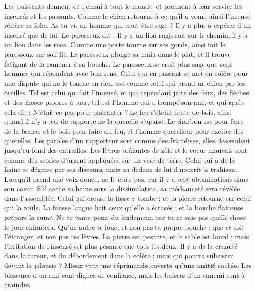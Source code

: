 \begin{multicols}{2}
Les puissants donnent de l'ennui à tout le monde, et prennent à leur service les insensés et les passants.
Comme le chien retourne à ce qu'il a vomi, ainsi l'insensé réitère sa folie.
As-tu vu un homme qui croit être sage ? Il y a plus à espérer d'un insensé que de lui.
Le paresseux dit : Il y a un lion rugissant sur le chemin, il y a un lion dans les rues.
Comme une porte tourne sur ses gonds, ainsi fait le paresseux sur son lit.
Le paresseux plonge sa main dans le plat, et il trouve fatigant de la ramener à sa bouche.
Le paresseux se croit plus sage que sept hommes qui répondent avec bon sens.
Celui qui en passant se met en colère pour une dispute qui ne le touche en rien, est comme celui qui prend un chien par les oreilles.
Tel est celui qui fait l'insensé, et qui cependant jette des feux, des flèches, et des choses propres à tuer,
tel est l'homme qui a trompé son ami, et qui après cela dit : N'était-ce pas pour plaisanter ?
Le feu s'éteint faute de bois, ainsi quand il n'y a pas de rapporteurs la querelle s'apaise.
Le charbon est pour faire de la braise, et le bois pour faire du feu, et l'homme querelleur pour exciter des querelles.
Les paroles d'un rapporteur sont comme des friandises, elles descendent jusqu'au fond des entrailles.
Les lèvres brûlantes de zèle et le coeur mauvais sont comme des scories d'argent appliquées sur un vase de terre.
Celui qui a de la haine se déguise par ses discours, mais au-dedans de lui il nourrit la trahison.
Lorsqu'il prend une voix douce, ne le crois pas, car il y a sept abominations dans son coeur.
S'il cache sa haine sous la dissimulation, sa méchanceté sera révélée dans l'assemblée.
Celui qui creuse la fosse y tombe ; et la pierre retourne sur celui qui la roule.
La fausse langue hait ceux qu'elle a écrasés ; et la bouche flatteuse prépare la ruine.
\VerseOne{}Ne te vante point du lendemain, car tu ne sais pas quelle chose le jour enfantera.
Qu'un autre te loue, et non pas ta propre bouche ; que ce soit l'étranger, et non pas tes lèvres.
La pierre est pesante, et le sable est lourd ; mais l'irritation de l'insensé est plus pesante que tous les deux.
Il y a de la cruauté dans la fureur, et du débordement dans la colère ; mais qui pourra subsister devant la jalousie ?
Mieux vaut une réprimande ouverte qu'une amitié cachée.
Les blessures d'un ami sont dignes de confiance, mais les baisers d'un ennemi sont à craindre.

\end{multicols}
